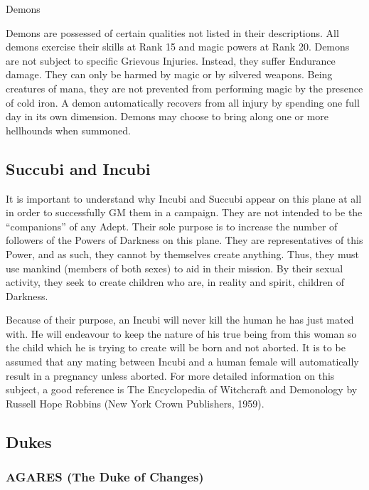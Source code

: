 \begin{mmgroup}{Demons}

Demons are possessed of certain qualities not listed in their
descriptions.  All demons exercise their skills at Rank 15 and magic
powers at Rank 20.  Demons are not subject to specific Grievous
Injuries.  Instead, they suffer Endurance damage.  They can only be
harmed by magic or by silvered weapons.  Being creatures of mana, they
are not prevented from performing magic by the presence of cold iron.
A demon automatically recovers from all injury by spending one full
day in its own dimension.  Demons may choose to bring along one or
more hellhounds when summoned.

\subsection{Succubi and Incubi}
It is important to understand why Incubi and Succubi appear on this
plane at all in order to successfully GM them in a campaign.  They are
not intended to be the ``companions'' of any Adept.  Their sole
purpose is to increase the number of followers of the Powers of
Darkness on this plane.  They are representatives of this Power, and
as such, they cannot by themselves create anything.  Thus, they must
use mankind (members of both sexes) to aid in their mission.  By their
sexual activity, they seek to create children who are, in reality and
spirit, children of Darkness.

Because of their purpose, an Incubi will never kill the human he has
just mated with.  He will endeavour to keep the nature of his true
being from this woman so the child which he is trying to create will
be born and not aborted.  It is to be assumed that any mating between
Incubi and a human female will automatically result in a pregnancy
unless aborted.  For more detailed information on this subject, a good
reference is The Encyclopedia of Witchcraft and Demonology by Russell
Hope Robbins (New York Crown Publishers, 1959).

\subsection{Dukes}

\subsubsection{AGARES (The Duke of Changes)}

\begin{description}


\end{description}
\end{mmgroup}
